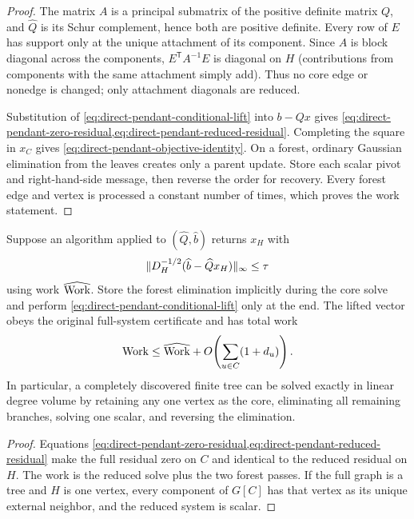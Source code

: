 \begin{proof}
The matrix $A$ is a principal submatrix of the positive definite matrix
$Q$, and $\widehat Q$ is its Schur complement, hence both are positive
definite.  Every row of $E$ has support only at the unique attachment of its
component.  Since $A$ is block diagonal across the components,
$E^\mathsf TA^{-1}E$ is diagonal on $H$ (contributions from components with
the same attachment simply add).  Thus no core edge or nonedge is changed;
only attachment diagonals are reduced.

Substitution of \cref{eq:direct-pendant-conditional-lift} into $b-Qx$ gives
\cref{eq:direct-pendant-zero-residual,eq:direct-pendant-reduced-residual}.
Completing the square in $x_C$ gives
\cref{eq:direct-pendant-objective-identity}.  On a forest, ordinary Gaussian
elimination from the leaves creates only a parent update.  Store each scalar
pivot and right-hand-side message, then reverse the order for recovery.
Every forest edge and vertex is processed a constant number of times, which
proves the work statement.
\end{proof}

\begin{corollary}
\label{cor:direct-pendant-core-composition}
Suppose an algorithm applied to $(\widehat Q,\widehat b)$ returns $x_H$ with
\begin{equation*}
 \lVert D_H^{-1/2}(\widehat b-\widehat Qx_H)\rVert_\infty\leq\tau
\end{equation*}
using work $\widehat{\operatorname{Work}}$.  Store the forest elimination implicitly during
the core solve and perform \cref{eq:direct-pendant-conditional-lift} only at
the end.  The lifted vector obeys the original full-system certificate and
has total work
\begin{equation}
 \operatorname{Work}\leq\widehat{\operatorname{Work}}
 +O\!\left(\sum_{u\in C}(1+d_u)\right).
 \label{eq:direct-pendant-composition-work}
\end{equation}
In particular, a completely discovered finite tree can be solved exactly in
linear degree volume by retaining any one vertex as the core, eliminating
all remaining branches, solving one scalar, and reversing the elimination.
\end{corollary}

\begin{proof}
Equations \cref{eq:direct-pendant-zero-residual,eq:direct-pendant-reduced-residual}
make the full residual zero on $C$ and identical to the reduced residual on
$H$.  The work is the reduced solve plus the two forest passes.  If the full
graph is a tree and $H$ is one vertex, every component of $G[C]$ has that
vertex as its unique external neighbor, and the reduced system is scalar.
\end{proof}

